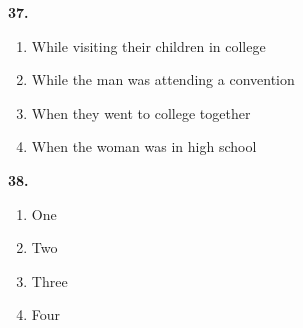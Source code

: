 \documentclass[12pt]{article}
\begin{document}
\par
\vspace{0.25\baselineskip}
\noindent\textbf{37.}
\begin{enumerate}[label=(\Alph*),leftmargin=*,itemsep=0.2em]
\item While visiting their children in college
\item While the man was attending a convention
\item When they went to college together
\item When the woman was in high school
\end{enumerate}
\par
\vspace{0.25\baselineskip}
\noindent\textbf{38.}
\begin{enumerate}[label=(\Alph*),leftmargin=*,itemsep=0.2em]
\item One
\item Two
\item Three
\item Four
\end{enumerate}
\par
\vspace{0.25\baselineskip}
\end{document}
